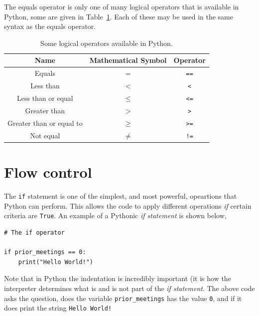 \documentclass[a4paper]{article}
\begin{document}
The equals operator is only one of many logical operators that is available in Python, some are given in Table~\ref{tab:ops}.
Each of these may be used in the same syntax as the equals operator.
\begin{table}[h]
	\centering
	\caption{Some logical operators available in Python.}
	\label{tab:ops}
	\begin{tabular}{c c c}
		\hline
		Name & Mathematical Symbol & Operator \\
		\hline
		Equals & $=$ &\texttt{==} \\
		Less than & $<$ & \texttt{<} \\
		Less than or equal & $\leq$ & \texttt{<=} \\
		Greater than & $>$ & \texttt{>} \\
		Greater than or equal to & $\geq$ & \texttt{>=} \\
		Not equal & $\neq$ & \texttt{!=}  \\
		\hline
	\end{tabular}
\end{table}
\vspace{\baselineskip}
\begin{center}
	\noindent{}
\end{center}

\section{Flow control}

The \texttt{if} statement is one of the simplest, and most powerful, opeartions that Python can perform.
This allows the code to apply different operations \emph{if} certain criteria are \texttt{True}.
An example of a Pythonic \emph{if statement} is shown below,
\begin{lstlisting}
# The if operator

if prior_meetings == 0:
    print("Hello World!")
\end{lstlisting}
Note that in Python the indentation is incredibly important (it is how the interpreter determines what is and is not part of the \emph{if statement}.
The above code asks the question, does the variable \texttt{prior\_meetings} has the value \texttt{0}, and if it does print the string \texttt{Hello World!}
\end{document}
